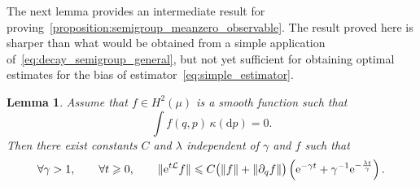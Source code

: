 \documentclass[11pt,a4paper]{article}
\newcommand{\e}{\mathrm{e}}
\renewcommand{\d}{\mathrm d}
\theoremstyle{plain}
\newtheorem{lemma}{Lemma}[section]
\numberwithin{equation}{section}
\renewcommand{\leq}{\leqslant}
\renewcommand{\geq}{\geqslant}
\begin{document}

The next lemma provides an intermediate result for proving~\cref{proposition:semigroup_meanzero_observable}.
The result proved here is sharper than what would be obtained from a simple application of~\eqref{eq:decay_semigroup_general},
but not yet sufficient for obtaining optimal estimates for the bias of estimator~\eqref{eq:simple_estimator}.
\begin{lemma}
    \label{lemma:initial_lemma}
    Assume that $f \in H^2(\mu)$ is a smooth function such that
    \begin{equation}
        \label{eq:assumption_f}
        \int f(q, p) \, \kappa(\d p) = 0.
    \end{equation}
    Then there exist constants $C$ and $\lambda$ independent of $\gamma$ and $f$ such that
    \[
        \forall \gamma > 1, \qquad
        \forall t \geq 0, \qquad
        \norm*{\e^{t\mathcal L} f}
        \leq C \bigl( \norm{f} + \norm{\partial_q f} \bigr)
        \left( \e^{- \gamma t} + \gamma^{-1} \e^{-\frac{\lambda t}{\gamma}} \right).
    \]
\end{lemma}
\end{document}
